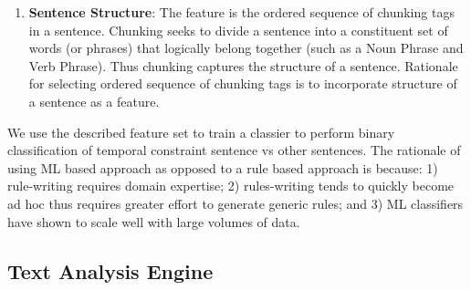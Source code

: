 \begin{enumerate}
	\item \textbf{Sentence Structure}: The feature is the ordered sequence of chunking tags~\cite{Klein03,KleinNIPS03} in a sentence. Chunking seeks to divide a sentence into a constituent set of words (or phrases) that logically belong together (such as a Noun Phrase and Verb Phrase). Thus chunking captures the structure of a sentence. Rationale for selecting ordered sequence of chunking tags is to incorporate structure of a sentence as a feature.        
		 
\end{enumerate}     


We use the described feature set to train a classier to perform binary classification of temporal constraint sentence vs other sentences. The rationale of using ML based approach as opposed to a rule based approach is because: 1) rule-writing requires domain expertise; 2) rules-writing tends to quickly become ad hoc thus requires greater effort to generate generic rules; and 3) ML classifiers have shown to scale well with large volumes of data.

 
%


\subsection{Text Analysis Engine}
\label{sub:TAE}

